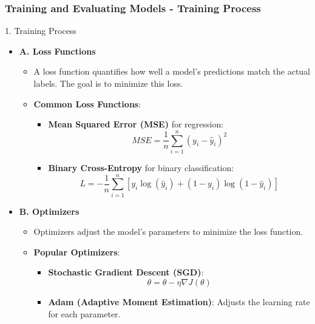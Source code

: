 \documentclass[aspectratio=169]{beamer}
\begin{document}
\begin{frame}[fragile]
    \frametitle{Training and Evaluating Models - Training Process}
    \begin{block}{1. Training Process}
        \begin{itemize}
            \item \textbf{A. Loss Functions}
                \begin{itemize}
                    \item A loss function quantifies how well a model's predictions match the actual labels. The goal is to minimize this loss.
                    \item \textbf{Common Loss Functions}:
                        \begin{itemize}
                            \item \textbf{Mean Squared Error (MSE)} for regression:
                            \begin{equation}
                                MSE = \frac{1}{n} \sum_{i=1}^{n} (y_i - \hat{y}_i)^2
                            \end{equation}
                            \item \textbf{Binary Cross-Entropy} for binary classification:
                            \begin{equation}
                                L = -\frac{1}{n} \sum_{i=1}^{n} [y_i \log(\hat{y}_i) + (1-y_i) \log(1-\hat{y}_i)]
                            \end{equation}
                        \end{itemize}
                \end{itemize}
            \item \textbf{B. Optimizers}
                \begin{itemize}
                    \item Optimizers adjust the model's parameters to minimize the loss function.
                    \item \textbf{Popular Optimizers}:
                        \begin{itemize}
                            \item \textbf{Stochastic Gradient Descent (SGD)}:
                            \begin{equation}
                                \theta = \theta - \eta \nabla J(\theta)
                            \end{equation}
                            \item \textbf{Adam (Adaptive Moment Estimation)}: Adjusts the learning rate for each parameter.

\end{itemize}
\end{itemize}
\end{itemize}
\end{block}
\end{frame}
\end{document}
